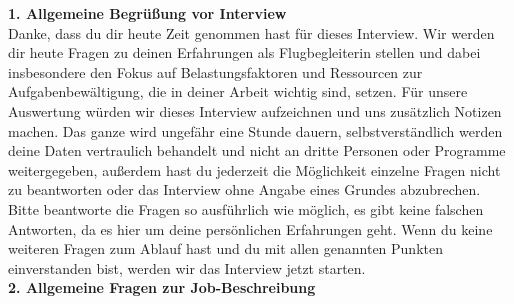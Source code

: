 \documentclass[12pt, a4paper]{article}
\begin{document}
\begin{tcolorbox}[
  breakable,
  colback=gray!10,
  colframe=black,
  arc=10pt,          %
  boxrule=0.5pt,
  left=6pt, right=6pt, top=6pt, bottom=6pt
]

\small

\textbf{1. Allgemeine Begrüßung vor Interview}\\

Danke, dass du dir heute Zeit genommen hast für dieses Interview. Wir werden dir heute
Fragen zu deinen Erfahrungen als Flugbegleiterin stellen und dabei insbesondere den Fokus
auf Belastungsfaktoren und Ressourcen zur Aufgabenbewältigung, die in deiner Arbeit
wichtig sind, setzen. Für unsere Auswertung würden wir dieses Interview aufzeichnen und
uns zusätzlich Notizen machen. Das ganze wird ungefähr eine Stunde dauern,
selbstverständlich werden deine Daten vertraulich behandelt und nicht an dritte Personen
oder Programme weitergegeben, außerdem hast du jederzeit die Möglichkeit einzelne
Fragen nicht zu beantworten oder das Interview ohne Angabe eines Grundes abzubrechen.
Bitte beantworte die Fragen so ausführlich wie möglich, es gibt keine falschen Antworten, da
es hier um deine persönlichen Erfahrungen geht. Wenn du keine weiteren Fragen zum
Ablauf hast und du mit allen genannten Punkten einverstanden bist, werden wir das
Interview jetzt starten.\\

\textbf{2. Allgemeine Fragen zur Job-Beschreibung}


\end{tcolorbox}
\end{document}

